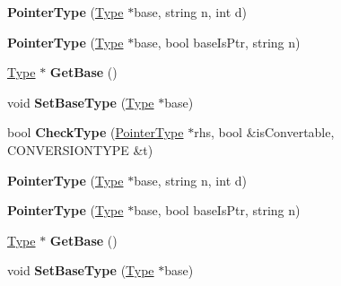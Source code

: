 \begin{DoxyCompactItemize}
\item 
\hypertarget{classPointerType_acb7c1bf4a82371e46d133a1471d1e3f3}{{\bfseries Pointer\-Type} (\hyperlink{classType}{Type} $\ast$base, string n, int d)}\label{classPointerType_acb7c1bf4a82371e46d133a1471d1e3f3}

\item 
\hypertarget{classPointerType_a58dbecb35ecd7ba2901db09aba00dcc7}{{\bfseries Pointer\-Type} (\hyperlink{classType}{Type} $\ast$base, bool base\-Is\-Ptr, string n)}\label{classPointerType_a58dbecb35ecd7ba2901db09aba00dcc7}

\item 
\hypertarget{classPointerType_acfdee349a0e18abd304f85d0b6d951ff}{\hyperlink{classType}{Type} $\ast$ {\bfseries Get\-Base} ()}\label{classPointerType_acfdee349a0e18abd304f85d0b6d951ff}

\item 
\hypertarget{classPointerType_abfb4082aafcedbe8660cfadabbe79f18}{void {\bfseries Set\-Base\-Type} (\hyperlink{classType}{Type} $\ast$base)}\label{classPointerType_abfb4082aafcedbe8660cfadabbe79f18}

\item 
\hypertarget{classPointerType_a01b7271726a3f891c9556cbbab3a4410}{bool {\bfseries Check\-Type} (\hyperlink{classPointerType}{Pointer\-Type} $\ast$rhs, bool \&is\-Convertable, C\-O\-N\-V\-E\-R\-S\-I\-O\-N\-T\-Y\-P\-E \&t)}\label{classPointerType_a01b7271726a3f891c9556cbbab3a4410}

\item 
\hypertarget{classPointerType_acb7c1bf4a82371e46d133a1471d1e3f3}{{\bfseries Pointer\-Type} (\hyperlink{classType}{Type} $\ast$base, string n, int d)}\label{classPointerType_acb7c1bf4a82371e46d133a1471d1e3f3}

\item 
\hypertarget{classPointerType_a58dbecb35ecd7ba2901db09aba00dcc7}{{\bfseries Pointer\-Type} (\hyperlink{classType}{Type} $\ast$base, bool base\-Is\-Ptr, string n)}\label{classPointerType_a58dbecb35ecd7ba2901db09aba00dcc7}

\item 
\hypertarget{classPointerType_acfdee349a0e18abd304f85d0b6d951ff}{\hyperlink{classType}{Type} $\ast$ {\bfseries Get\-Base} ()}\label{classPointerType_acfdee349a0e18abd304f85d0b6d951ff}

\item 
\hypertarget{classPointerType_abfb4082aafcedbe8660cfadabbe79f18}{void {\bfseries Set\-Base\-Type} (\hyperlink{classType}{Type} $\ast$base)}\label{classPointerType_abfb4082aafcedbe8660cfadabbe79f18}


\end{DoxyCompactItemize}
